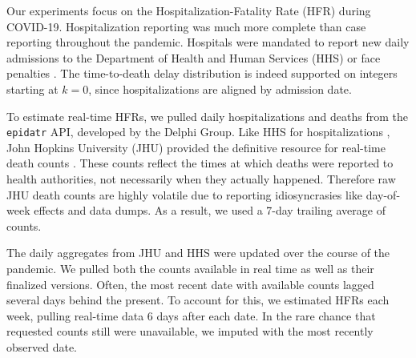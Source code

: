 \documentclass{article}
\begin{document}
Our experiments focus on the Hospitalization-Fatality Rate (HFR) during COVID-19. Hospitalization reporting was much more complete than case reporting throughout the pandemic. Hospitals were mandated to report new daily admissions to the Department of Health and Human Services (HHS) or face penalties \citep{HHS2023}. The time-to-death delay distribution is indeed supported on integers starting at $k=0$, since hospitalizations are aligned by admission date.


To estimate real-time HFRs, we pulled daily hospitalizations and deaths from the \texttt{epidatr} API, developed by the Delphi Group. Like HHS for hospitalizations \citep{HHS2023}, John Hopkins University (JHU) provided the definitive resource for real-time death counts \citep{JHUepidatr}. These counts reflect the times at which deaths were reported to health authorities, not necessarily when they actually happened. Therefore raw JHU death counts are highly volatile due to reporting idiosyncrasies like day-of-week effects and data dumps. As a result, we used a 7-day trailing average of counts. 

The daily aggregates from JHU and HHS were updated over the course of the pandemic. We pulled both the counts available in real time as well as their finalized versions. Often, the most recent date with available counts lagged several days behind the present. To account for this, we estimated HFRs each week, pulling real-time data 6 days after each date. In the rare chance that requested counts still were unavailable, we imputed with the most recently observed date.

\end{document}
